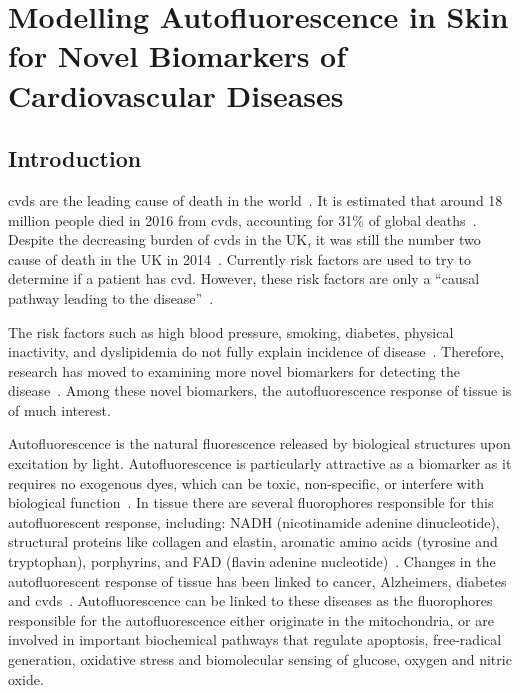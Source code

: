 \chapter{Modelling Autofluorescence in Skin for Novel Biomarkers of Cardiovascular Diseases}
\label{chap:salvo}




\section{Introduction}
\label{sec:salvointro}

\Gls*{cvds} are the leading cause of death in the world~\cite{whodeath}.
It is estimated that around 18 million people died in 2016 from \gls*{cvds}, accounting for 31\% of global deaths~\cite{whodeath}.
Despite the decreasing burden of \gls*{cvds} in the UK, it was still the number two cause of death in the UK in 2014~\cite{bhatnagar2016trends}.
Currently risk factors are used to try to determine if a patient has \gls*{cvd}.
However, these risk factors are only a ``causal pathway leading to the disease''~\cite{vasan2006biomarkers}.

The risk factors such as high blood pressure, smoking, diabetes, physical inactivity, and dyslipidemia do not fully explain incidence of disease~\cite{olsen2010assessment,folsom2013classical}.
Therefore, research has moved to examining more novel biomarkers for detecting the disease~\cite{melander2009novel,gerszten2008search,wang2017novel}.
Among these novel biomarkers, the autofluorescence response of tissue is of much interest.

Autofluorescence is the natural fluorescence released by biological structures upon excitation by light.
Autofluorescence is particularly attractive as a biomarker as it requires no exogenous dyes, which can be toxic, non-specific, or interfere with biological function~\cite{kollias1998endogenous}.
In tissue there are several fluorophores responsible for this autofluorescent response, including: NADH (nicotinamide adenine dinucleotide), structural proteins like collagen and elastin, aromatic amino acids (tyrosine and tryptophan), porphyrins, and FAD (flavin adenine nucleotide)~\cite{monici2005cell}.
Changes in the autofluorescent response of tissue has been linked to cancer, Alzheimers, diabetes and \gls*{cvds}~\cite{drakaki2009laser,pu2013native,ramanujam2000fluorescence,tarnawska2018pilot,van2019skin}.
Autofluorescence can be linked to these diseases as the fluorophores responsible for the autofluorescence either originate in the mitochondria, or are involved in important biochemical pathways that regulate apoptosis, free-radical generation, oxidative stress and biomolecular sensing of glucose, oxygen and nitric oxide.

